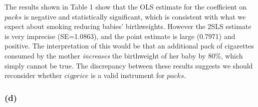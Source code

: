 \documentclass[
]{article}
\newenvironment{Shaded}{\begin{snugshade}}{\end{snugshade}}
\newcommand{\AttributeTok}[1]{\textcolor[rgb]{0.77,0.63,0.00}{#1}}
\newcommand{\CommentTok}[1]{\textcolor[rgb]{0.56,0.35,0.01}{\textit{#1}}}
\newcommand{\FunctionTok}[1]{\textcolor[rgb]{0.00,0.00,0.00}{#1}}
\newcommand{\NormalTok}[1]{#1}
\newcommand{\OtherTok}[1]{\textcolor[rgb]{0.56,0.35,0.01}{#1}}
\newcommand{\SpecialCharTok}[1]{\textcolor[rgb]{0.00,0.00,0.00}{#1}}
\newcommand{\StringTok}[1]{\textcolor[rgb]{0.31,0.60,0.02}{#1}}
\begin{document}
\begin{Shaded}
\end{Shaded}

The results shown in Table 1 show that the OLS estimate for the
coefficient on \(packs\) is negative and statistically significant,
which is consistent with what we expect about smoking reducing babies'
birthweights. However the 2SLS estimate is very imprecise (SE=1.0863),
and the point estimate is large (0.7971) and positive. The
interpretation of this would be that an additional pack of cigarettes
consumed by the mother \emph{increases} the birthweight of her baby by
80\%, which simply cannot be true. The discrepancy between these results
suggests we should reconsider whether \(cigprice\) is a valid instrument
for \(packs\).

\hypertarget{d}{%
\subsubsection{(d)}\label{d}}
\end{document}
